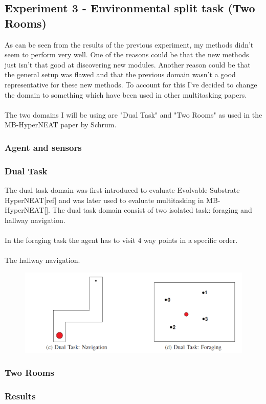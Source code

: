 \documentclass[11pt, a4paper]{article}
\begin{document}
\subsection{Experiment 3 - Environmental split task (Two Rooms)}
As can be seen from the results of the previous experiment, my methods didn't seem to perform very well. One of the reasons could be that the new methods just isn't that good at discovering new modules. Another reason could be that the general setup was flawed and that the previous domain wasn't a good representative for these new methods. To account for this I've decided to change the domain to something which have been used in other multitasking papers.
\\
\\
The two domains I will be using are "Dual Task" and "Two Rooms" as used in the MB-HyperNEAT paper by Schrum.
\subsubsection{Agent and sensors}
\subsubsection{Dual Task}
The dual task domain was first introduced to evaluate Evolvable-Substrate HyperNEAT[ref] and was later used to evaluate multitasking in MB-HyperNEAT[]. The dual task domain consist of two isolated task: foraging and hallway navigation.
\\
\\
In the foraging task the agent has to visit 4 way points in a specific order.
\\
\\
The hallway navigation.
\begin{figure}[!ht]
\centering
\includegraphics[scale=0.4]{DualTaskDomain}
\caption{}
\end{figure}
\subsubsection{Two Rooms}
\subsubsection{Results}
\end{document}
